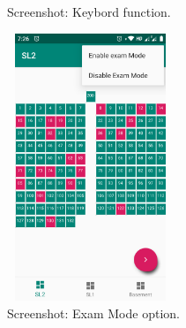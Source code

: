 \documentclass[oneside,a4paper,12pt]{article}
\begin{document}
\begin{figure}[H]
\begin{minipage}{0.46\textwidth}
            \caption{Screenshot: Keybord function.}
        \end{minipage}\hfill
        \begin{minipage}{0.46\textwidth}
            \centering
            \includegraphics[width=5cm,height=8cm]{assets/exammode.png}
            \caption{Screenshot: Exam Mode option.}
        \end{minipage}\hfill       
\end{figure}
\end{document}
